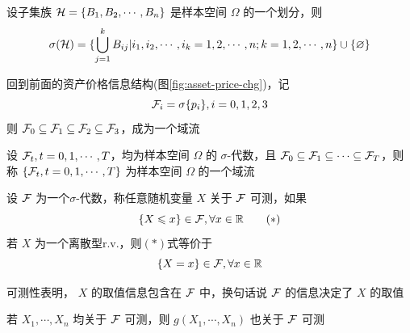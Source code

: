 \begin{example}
    设子集族 $\mathcal{H}=\{B_1,B_2,\cdots,B_n\}$ 是样本空间 $\Omega$ 的一个划分，则
    \[
    \sigma(\mathcal{H})=\{\bigcup_{j=1}^k B_{ij}|i_1,i_2,\cdots,i_k=1,2,\cdots,n;k=1,2,\cdots,n\}\cup \{\varnothing\}
    \]
\end{example}

回到前面的资产价格信息结构(图\ref{fig:asset-price-chg})，记
\[
\mathcal{F}_i=\sigma\{p_i\},i=0,1,2,3
\]
则 $\mathcal{F}_0\subseteq \mathcal{F}_1\subseteq \mathcal{F}_2\subseteq \mathcal{F}_3$，成为一个域流

\begin{definition}[域流]
    设 $\mathcal{F}_t,t=0,1,\cdots,T$，均为样本空间 $\Omega$ 的 $\sigma$-代数，且 $\mathcal{F}_0\subseteq \mathcal{F}_1\subseteq \cdots\subseteq \mathcal{F}_T$，则称 $\{\mathcal{F}_t,t=0,1,\cdots,T\}$ 为样本空间 $\Omega$ 的一个域流
\end{definition}

\begin{definition}[可测性]
    设 $\mathcal{F}$ 为一个$\sigma$-代数，称任意随机变量 $X$ 关于 $\mathcal{F}$ 可测，如果
    \[
    \{X\leqslant x\}\in \mathcal{F},\forall x\in \mathbb{R}\tag{$*$}
    \]
    若 $X$ 为一个离散型r.v.，则$(*)$式等价于
    \[
        \{X= x\}\in \mathcal{F},\forall x\in \mathbb{R}
    \]
\end{definition}

可测性表明， $X$ 的取值信息包含在 $\mathcal{F}$ 中，换句话说 $\mathcal{F}$ 的信息决定了 $X$ 的取值

\begin{property}
若 $X_1,\cdots,X_n$ 均关于 $\mathcal{F}$ 可测，则 $g(X_1,\cdots,X_n)$ 也关于 $\mathcal{F}$ 可测
\end{property}


